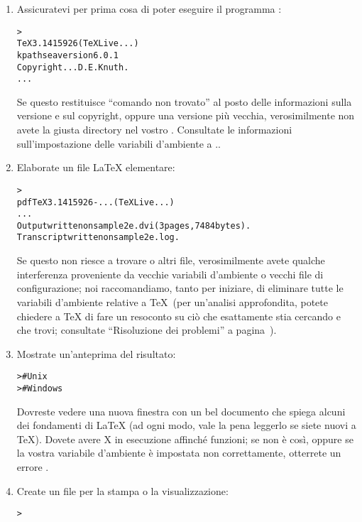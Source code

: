 \documentclass{article}
\begin{document}
\begin{enumerate}

\item Assicuratevi per prima cosa di poter eseguire il programma
:
\begin{alltt}
> 
TeX 3.1415926 (TeX Live ...)
kpathsea version 6.0.1
Copyright ... D.E. Knuth.
...
\end{alltt}
Se questo restituisce ``comando non trovato'' al posto delle informazioni
sulla versione e sul copyright, oppure una versione più vecchia,
verosimilmente non avete la giusta directory  nel vostro
. Consultate le informazioni sull'impostazione delle
variabili d'ambiente a \p.\pageref{sec:env}.

\item Elaborate un file \LaTeX{} elementare:
\begin{alltt}
> 
pdfTeX 3.1415926-... (TeX Live ...)
...
Output written on sample2e.dvi (3 pages, 7484 bytes).
Transcript written on sample2e.log.
\end{alltt}
Se questo non riesce a trovare  o altri file,
verosimilmente avete qualche interferenza proveniente da vecchie variabili
d'ambiente o vecchi file di configurazione; noi raccomandiamo, tanto per
iniziare, di eliminare tutte le variabili d'ambiente relative a \TeX\ (per
un'analisi approfondita, potete chiedere a \TeX{} di fare un resoconto su
ciò che esattamente stia cercando e che trovi; consultate ``Risoluzione
dei problemi'' a pagina~\pageref{sec:debugging}).

\item Mostrate un'anteprima del risultato:
\begin{alltt}
>     # Unix
>   # Windows
\end{alltt}
Dovreste vedere una nuova finestra con un bel documento che spiega alcuni
dei fondamenti di \LaTeX{} (ad ogni modo, vale la pena leggerlo se siete
nuovi a \TeX). Dovete avere X in esecuzione affinché 
funzioni; se non è così, oppure se la vostra variabile d'ambiente
 è impostata non correttamente, otterrete un errore
.

\item Create un file \PS{} per la stampa o la visualizzazione:
\begin{alltt}
> 
\end{alltt}


\end{enumerate}
\end{document}
